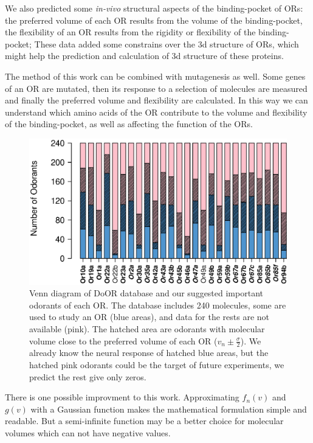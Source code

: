 \documentclass[11pt]{paper} %
\begin{document}
We also predicted some {\it in-vivo} structural aspects of  the binding-pocket of ORs:
the preferred volume of each OR results from the volume of the binding-pocket,
the flexibility of an OR results from the rigidity or flexibility of the binding-pocket; 
These data added some constrains over the 3d structure of ORs, 
which might help the prediction and calculation of 3d structure of these proteins. 

The method of this work can be combined with mutagenesis as well. 
Some genes of an OR are mutated, 
then its response to a selection of molecules are measured and finally the preferred volume and flexibility are calculated.
In this way we can understand which amino acids of the OR contribute to the volume and flexibility of the binding-pocket, 
as well as affecting the function of the ORs.


\begin{figure}
\centering
	\includegraphics[width=\textwidth]{odorant-suggest}
	\caption{Venn diagram of DoOR database and our suggested important odorants of each OR.
			The database includes 240 molecules, 
			some are used to study an OR (blue areas), 
			and data for the rests are not available (pink).
			The hatched area are odorants with molecular volume close to the preferred volume of each OR
			($v_n \pm \frac{\sigma}{2}$).
			We already know the neural response of hatched blue areas, 
			but the hatched pink odorants could be the target of future experiments, we predict the rest give only zeros.
			}
	\label{fig:odorant-suggest}
\end{figure}


There is one possible improvment to this work. Approximating $f_n(v)$ and $g(v)$ with a Gaussian function makes the mathematical formulation simple and readable. 
But a semi-infinite function may be a better choice for molecular volumes which can not have negative values.
\end{document}
